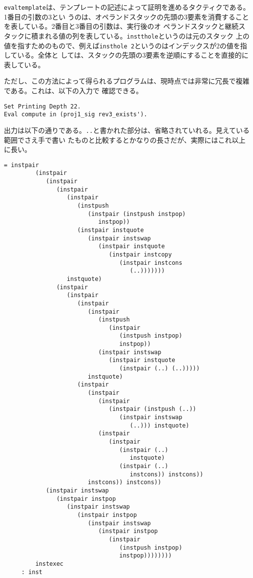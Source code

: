 \documentclass[a4paper, 10pt, twocolumn, titlepage]{ujarticle}
\renewcommand{\{}{\symbol{"7B}}
\renewcommand{\}}{\symbol{"7D}}
\begin{document}
\texttt{evaltemplate}は、テンプレートの記述によって証明を進めるタクティクである。1番目の引数の3とい
うのは、オペランドスタックの先頭の3要素を消費することを表している。2番目と3番目の引数は、実行後のオ
ペランドスタックと継続スタックに積まれる値の列を表している。\texttt{instthole}というのは元のスタック
上の値を指すためのもので、例えば\texttt{insthole 2}というのはインデックスが2の値を指している。全体と
しては、スタックの先頭の3要素を逆順にすることを直接的に表している。

ただし、この方法によって得られるプログラムは、現時点では非常に冗長で複雑である。これは、以下の入力で
確認できる。

\begin{lstlisting}[style=plain]
Set Printing Depth 22.
Eval compute in (proj1_sig rev3_exists').
\end{lstlisting}

出力は以下の通りである。\texttt{..}と書かれた部分は、省略されていれる。見えている範囲でさえ手で書い
たものと比較するとかなりの長さだが、実際にはこれ以上に長い。

\begin{lstlisting}[style=plain]
     = instpair
         (instpair
            (instpair
               (instpair
                  (instpair
                     (instpush
                        (instpair (instpush instpop)
                           instpop))
                     (instpair instquote
                        (instpair instswap
                           (instpair instquote
                              (instpair instcopy
                                 (instpair instcons
                                    (..)))))))
                  instquote)
               (instpair
                  (instpair
                     (instpair
                        (instpair
                           (instpush
                              (instpair
                                 (instpush instpop)
                                 instpop))
                           (instpair instswap
                              (instpair instquote
                                 (instpair (..) (..)))))
                        instquote)
                     (instpair
                        (instpair
                           (instpair
                              (instpair (instpush (..))
                                 (instpair instswap
                                    (..))) instquote)
                           (instpair
                              (instpair
                                 (instpair (..)
                                    instquote)
                                 (instpair (..)
                                    instcons)) instcons))
                        instcons)) instcons))
            (instpair instswap
               (instpair instpop
                  (instpair instswap
                     (instpair instpop
                        (instpair instswap
                           (instpair instpop
                              (instpair
                                 (instpush instpop)
                                 instpop))))))))
         instexec
     : inst
\end{lstlisting}
\end{document}
